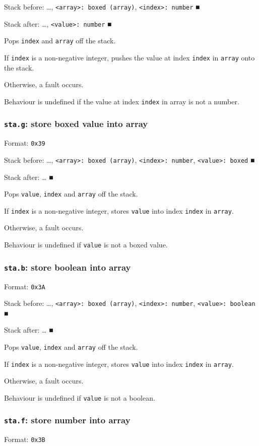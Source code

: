 \documentclass[11pt]{article}
\begin{document}
Stack before: \ldots{}​, \texttt{<array>: boxed (array)}, \texttt{<index>: number} ■

Stack after: \ldots{}​, \texttt{<value>: number} ■

Pops \texttt{index} and \texttt{array} off the stack.

If \texttt{index} is a non-negative integer, pushes the value at index \texttt{index}
in \texttt{array} onto the stack.

Otherwise, a fault occurs.

Behaviour is undefined if the value at index \texttt{index} in array is not a
number.

\subsubsection{\texttt{sta.g}: store boxed value into array}
\label{sec:org4724d89}
Format: \texttt{0x39}

Stack before: \ldots{}​, \texttt{<array>: boxed (array)}, \texttt{<index>: number},
\texttt{<value>: boxed} ■

Stack after: \ldots{}​ ■

Pops \texttt{value}, \texttt{index} and \texttt{array} off the stack.

If \texttt{index} is a non-negative integer, stores \texttt{value} into index \texttt{index}
in \texttt{array}.

Otherwise, a fault occurs.

Behaviour is undefined if \texttt{value} is not a boxed value.

\subsubsection{\texttt{sta.b}: store boolean into array}
\label{sec:org8e9e3f6}
Format: \texttt{0x3A}

Stack before: \ldots{}​, \texttt{<array>: boxed (array)}, \texttt{<index>: number},
\texttt{<value>: boolean} ■

Stack after: \ldots{}​ ■

Pops \texttt{value}, \texttt{index} and \texttt{array} off the stack.

If \texttt{index} is a non-negative integer, stores \texttt{value} into index \texttt{index}
in \texttt{array}.

Otherwise, a fault occurs.

Behaviour is undefined if \texttt{value} is not a boolean.

\subsubsection{\texttt{sta.f}: store number into array}
\label{sec:org3dfaf54}
Format: \texttt{0x3B}
\end{document}
